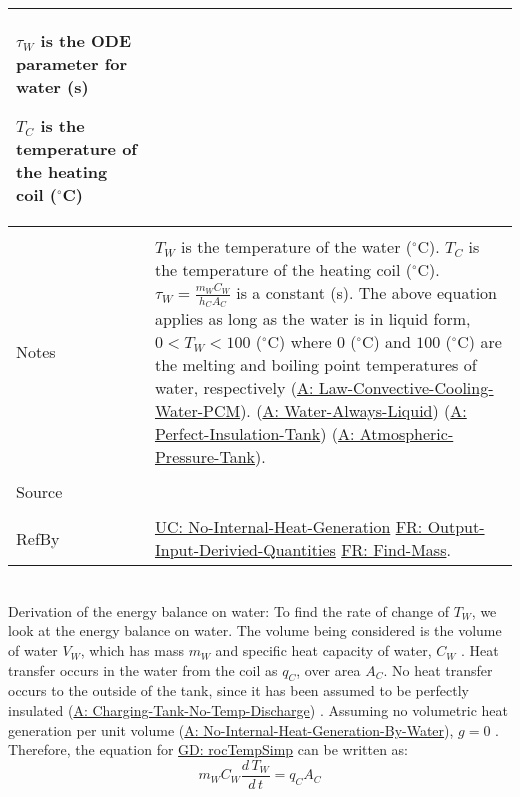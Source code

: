 \documentclass[12pt]{article}
\begin{document}
\begin{minipage}{\textwidth}
\begin{tabular}{p{} p{}}
\begin{symbDescription}
              \item{${τ_{W}}$ is the ODE parameter for water (s)}
              \item{${T_{C}}$ is the temperature of the heating coil (${}^{\circ}$C)}
              \end{symbDescription}
\\ \midrule \\
Notes & ${T_{W}}$ is the temperature of the water (${}^{\circ}$C). ${T_{C}}$ is the temperature of the heating coil (${}^{\circ}$C). ${τ_{W}}=\frac{{m_{W}} {C_{W}}}{{h_{C}} {A_{C}}}$ is a constant (s). The above equation applies as long as the water is in liquid form, $0<{T_{W}}<100$ (${}^{\circ}$C) where $0$ (${}^{\circ}$C) and $100$ (${}^{\circ}$C) are the melting and boiling point temperatures of water, respectively (\hyperref[A:Law-Convective-Cooling-Water-PCM]{A: Law-Convective-Cooling-Water-PCM}). (\hyperref[A:Water-Always-Liquid]{A: Water-Always-Liquid}) (\hyperref[A:Perfect-Insulation-Tank]{A: Perfect-Insulation-Tank}) (\hyperref[A:Atmospheric-Pressure-Tank]{A: Atmospheric-Pressure-Tank}).
\\ \midrule \\
Source & \cite{koothoor2013}
\\ \midrule \\
RefBy & \hyperref[unlikeChgNIHG]{UC: No-Internal-Heat-Generation} \hyperref[reqOIDQ]{FR: Output-Input-Derivied-Quantities} \hyperref[reqFM]{FR: Find-Mass}.
\\ \bottomrule \end{tabular}
\end{minipage}\\
Derivation of the energy balance on water:
To find the rate of change of ${T_{W}}$, we look at the energy balance on water. The volume being considered is the volume of water ${V_{W}}$, which has mass ${m_{W}}$ and specific heat capacity of water, ${C_{W}}$ . Heat transfer occurs in the water from the coil as ${q_{C}}$, over area ${A_{C}}$. No heat transfer occurs to the outside of the tank, since it has been assumed to be perfectly insulated (\hyperref[A:Charging-Tank-No-Temp-Discharge]{A: Charging-Tank-No-Temp-Discharge}) . Assuming no volumetric heat generation per unit volume (\hyperref[A:No-Internal-Heat-Generation-By-Water]{A: No-Internal-Heat-Generation-By-Water}), $g=0$ . Therefore, the equation for \hyperref[GD:rocTempSimp]{GD: rocTempSimp} can be written as:
\begin{dmath}
{m_{W}} {C_{W}} \frac{d\,{T_{W}}}{d\,t}={q_{C}} {A_{C}}
\end{dmath}
\end{document}

